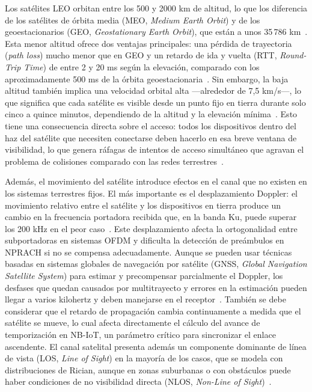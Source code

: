 Los satélites LEO orbitan entre los 500 y 2000 km de altitud, lo que los diferencia de los
satélites de órbita media (MEO, \textit{Medium Earth Orbit}) y de los geoestacionarios
(GEO, \textit{Geostationary Earth Orbit}), que están a unos
35\,786 km~\cite{ref8, ref12}. Esta menor altitud ofrece dos ventajas principales: una
pérdida de trayectoria (\textit{path loss}) mucho menor que en GEO y un retardo de ida y
vuelta (RTT, \textit{Round-Trip Time}) de entre 2 y 20 ms según la elevación, comparado con
los aproximadamente 500 ms de la órbita geoestacionaria~\cite{ref8}. Sin embargo, la baja
altitud también implica una velocidad orbital alta ---alrededor de 7{,}5 km/s---, lo que
significa que cada satélite es visible desde un punto fijo en tierra durante solo cinco a
quince minutos, dependiendo de la altitud y la elevación mínima~\cite{ref12}. Esto tiene
una consecuencia directa sobre el acceso: todos los dispositivos dentro del haz del satélite
que necesiten conectarse deben hacerlo en esa breve ventana de visibilidad, lo que genera
ráfagas de intentos de acceso simultáneo que agravan el problema de colisiones comparado
con las redes terrestres~\cite{ref7}.

Además, el movimiento del satélite introduce efectos en el canal que no existen en los
sistemas terrestres fijos. El más importante es el desplazamiento Doppler: el movimiento
relativo entre el satélite y los dispositivos en tierra produce un cambio en la frecuencia
portadora recibida que, en la banda Ku, puede superar los 200 kHz en el peor
caso~\cite{ref8}. Este desplazamiento afecta la ortogonalidad entre subportadoras en sistemas
OFDM y dificulta la detección de preámbulos en NPRACH si no se compensa adecuadamente.
Aunque se pueden usar técnicas basadas en sistemas globales de navegación por satélite (GNSS,
\textit{Global Navigation Satellite System}) para estimar y precompensar parcialmente el
Doppler, los desfases que quedan causados por multitrayecto y errores en la estimación
pueden llegar a varios kilohertz y deben manejarse en el receptor~\cite{ref8}. También se debe
considerar que el retardo de propagación cambia continuamente a medida que el satélite
se mueve, lo cual afecta directamente el cálculo del avance de temporización en NB-IoT, un
parámetro crítico para sincronizar el enlace ascendente. El canal satelital presenta además
un componente dominante de línea de vista (LOS, \textit{Line of Sight}) en la mayoría de los
casos, que se modela con distribuciones de Rician, aunque en zonas suburbanas o con
obstáculos puede haber condiciones de no visibilidad directa (NLOS, \textit{Non-Line of
Sight})~\cite{ref7}.

